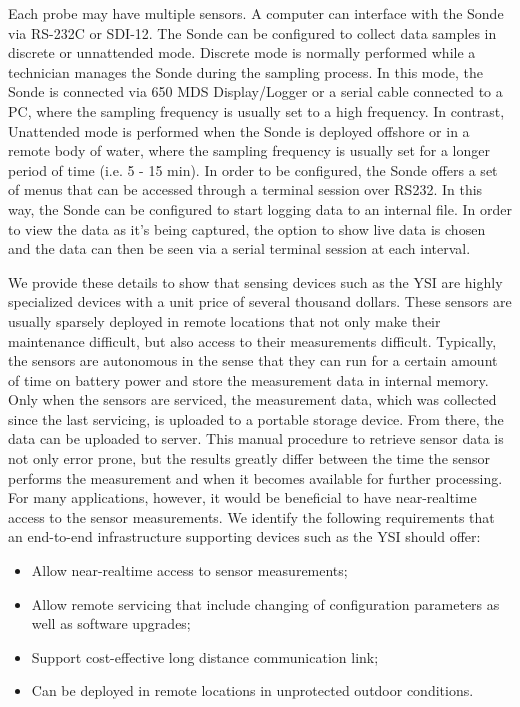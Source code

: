 \documentclass[conference]{IEEEtran}
\begin{document}
Each probe may have multiple sensors.  A computer can interface with
the Sonde via RS-232C or SDI-12. The Sonde can be configured to
collect data samples in discrete or unnattended mode.  Discrete mode
is normally performed while a technician manages the Sonde during the
sampling process. In this mode, the Sonde is connected via 650
MDS Display/Logger or a serial cable connected to a PC, where the sampling
frequency is usually set to a high frequency. In contrast, Unattended
mode is performed when the Sonde is deployed offshore or in a
remote body of water, where the sampling frequency is usually set for a
longer period of time (i.e. 5 - 15 min). In order to be configured,
the Sonde offers a set of menus that can be accessed through a terminal session
over RS232. In this way, the Sonde can be configured to
start logging data to an internal file. In order to view the data as it's
being captured, the option to show live data is chosen and the data can then be 
seen via a serial terminal session at each interval.

We provide these details to show that sensing devices such as the YSI
are highly specialized devices with a unit price of several thousand
dollars. These sensors are usually sparsely deployed in remote
locations that not only make their maintenance difficult, but also
access to their measurements difficult.  Typically, the sensors are autonomous
in the sense that they can run for a certain amount of time on battery power and
store the measurement data in internal memory. Only when the sensors
are serviced, the measurement data, which was collected since the last
servicing, is uploaded to a portable storage device. From there, the
data can be uploaded to server. This manual procedure to retrieve
sensor data is not only error prone, but the results greatly differ
between the time the sensor performs the measurement and when
it becomes available for further processing. For many applications,
however, it would be beneficial to have near-realtime access to the
sensor measurements. We identify the following requirements that an
end-to-end infrastructure supporting devices such as the YSI should
offer:

\begin{itemize}
\item Allow near-realtime access to sensor measurements;
\item Allow remote servicing that include changing of configuration
  parameters as well as software upgrades;
\item Support cost-effective long distance communication link;
\item Can be deployed in remote locations in unprotected outdoor
  conditions.
\end{itemize}
\end{document}
